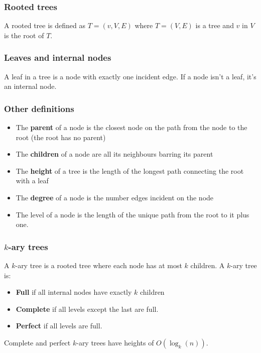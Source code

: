 \documentclass[a4paper, 12pt, twoside]{article}
\begin{document}
\subsubsection{Rooted trees}

A rooted tree is defined as $T = (v, V, E)$ where $T = (V, E)$ is a
tree and $v$ in $V$ is the root of $T$.

\subsubsection{Leaves and internal nodes}

A leaf in a tree is a node with exactly one incident edge. If a node
isn't a leaf, it's an internal node.

\subsubsection{Other definitions}

\begin{itemize}
      \item The \textbf{parent} of a node is the closest node on
      the path from the node to the root (the root has no parent)
      \item The \textbf{children} of a node are all its neighbours
      barring its parent
      \item The \textbf{height} of a tree is the length of the
      longest path connecting the root with a leaf
      \item The \textbf{degree} of a node is the number edges
      incident on the node
      \item The level of a node is the length of the unique path
      from the root to it plus one.
\end{itemize}

\subsubsection{$k$-ary trees}

A $k$-ary tree is a rooted tree where each node has at most $k$
children. A $k$-ary tree is:
\begin{itemize}
      \item \textbf{Full} if all internal nodes have exactly 
      $k$ children
      \item \textbf{Complete} if all levels except the last are full.
      \item \textbf{Perfect} if all levels are full.
\end{itemize}
Complete and perfect $k$-ary trees have heights of $O(\log_k(n))$.
\end{document}
